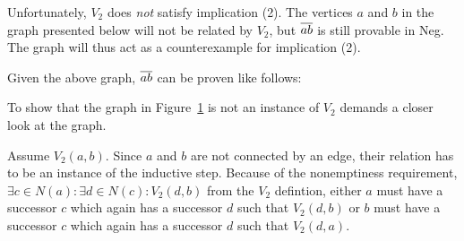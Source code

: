 Unfortunately, $V_2$ does \textit{not} satisfy implication (2).
The vertices $a$ and $b$ in the graph presented below will not be related by $V_2$, but $\ol{ab}$ is still provable in Neg.
The graph will thus act as a counterexample for implication (2).\par
\begin{figure}[!h]
  \centering
  \caption{}
  \label{fig:v2_counter_graph}
\end{figure}
\FloatBarrier
Given the above graph, $\ol{ab}$ can be proven like follows:\par
\begin{figure}[!h]
  \centering
  \begin{prooftree*}
  \end{prooftree*}
  \caption{}
  \label{fig:v2_counter_proof}
\end{figure}
To show that the graph in Figure~\ref{fig:v2_counter_graph} is not an instance of $V_2$ demands a closer look at the graph.

Assume $V_2(a,b)$.
Since $a$ and $b$ are not connected by an edge, their relation has to be an instance of the inductive step.
Because of the nonemptiness requirement, $\exists c \in N(a):\exists d \in N(c): V_2(d,b)$ from the $V_2$ defintion, either $a$  must have a successor $c$ which again has a successor $d$ such that $V_2(d,b)$ or $b$ must have a successor $c$ which again has a successor $d$ such that $V_2(d,a)$.

